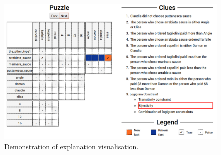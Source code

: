 \begin{figure}[t]
\centering
\includegraphics[width=1\linewidth]{zebra_screen}
\caption{Demonstration of explanation visualisation.}
\label{fig:zebrascreen}
\end{figure}

